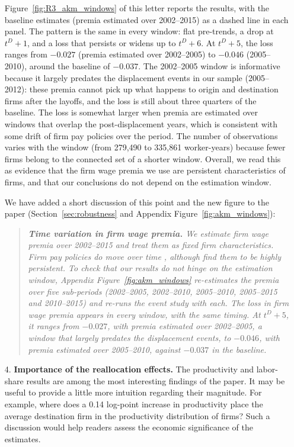 \documentclass[11pt]{article}
\newcommand{\comment}[1]{\begingroup #1\endgroup}
\begin{document}
\begin{enumerate}[leftmargin=*]
{Figure~\ref{fig:R3_akm_windows} of this letter reports the results, with the baseline estimates (premia estimated over 2002--2015) as a dashed line in each panel. The pattern is the same in every window: flat pre-trends, a drop at $t^D+1$, and a loss that persists or widens up to $t^D+6$. At $t^D+5$, the loss ranges from $-0.027$ (premia estimated over 2002--2005) to $-0.046$ (2005--2010), around the baseline of $-0.037$. The 2002--2005 window is informative because it largely predates the displacement events in our sample (2005--2012): these premia cannot pick up what happens to origin and destination firms after the layoffs, and the loss is still about three quarters of the baseline. The loss is somewhat larger when premia are estimated over windows that overlap the post-displacement years, which is consistent with some drift of firm pay policies over the period. The number of observations varies with the window (from 279,490 to 335,861 worker-years) because fewer firms belong to the connected set of a shorter window. Overall, we read this as evidence that the firm wage premia we use are persistent characteristics of firms, and that our conclusions do not depend on the estimation window.

We have added a short discussion of this point and the new figure to the paper (Section~\ref{sec:robustness} and Appendix Figure~\ref{fig:akm_windows}):
\begin{quote}\itshape
\textbf{Time variation in firm wage premia.} We estimate firm wage premia over 2002--2015 and treat them as fixed firm characteristics. Firm pay policies do move over time \citep{lachowska2023drift,engbom2023firmpay}, although \citet{lachowska2023drift} find them to be highly persistent. To check that our results do not hinge on the estimation window, Appendix Figure~\ref{fig:akm_windows} re-estimates the premia over five sub-periods (2002--2005, 2002--2010, 2005--2010, 2005--2015 and 2010--2015) and re-runs the event study with each. The loss in firm wage premia appears in every window, with the same timing. At $t^D+5$, it ranges from $-0.027$, with premia estimated over 2002--2005, a window that largely predates the displacement events, to $-0.046$, with premia estimated over 2005--2010, against $-0.037$ in the baseline.
\end{quote}
}\par

\item[4.] 
\comment{\textbf{Importance of the reallocation effects.} The productivity and labor-share results
are among the most interesting findings of the paper. It may be useful to
provide a little more intuition regarding their magnitude. For example, where does
a 0.14 log-point increase in productivity place the average destination firm in the
productivity distribution of firms? Such a discussion would help readers assess the
economic significance of the estimates.
}\par


\end{enumerate}
\end{document}
